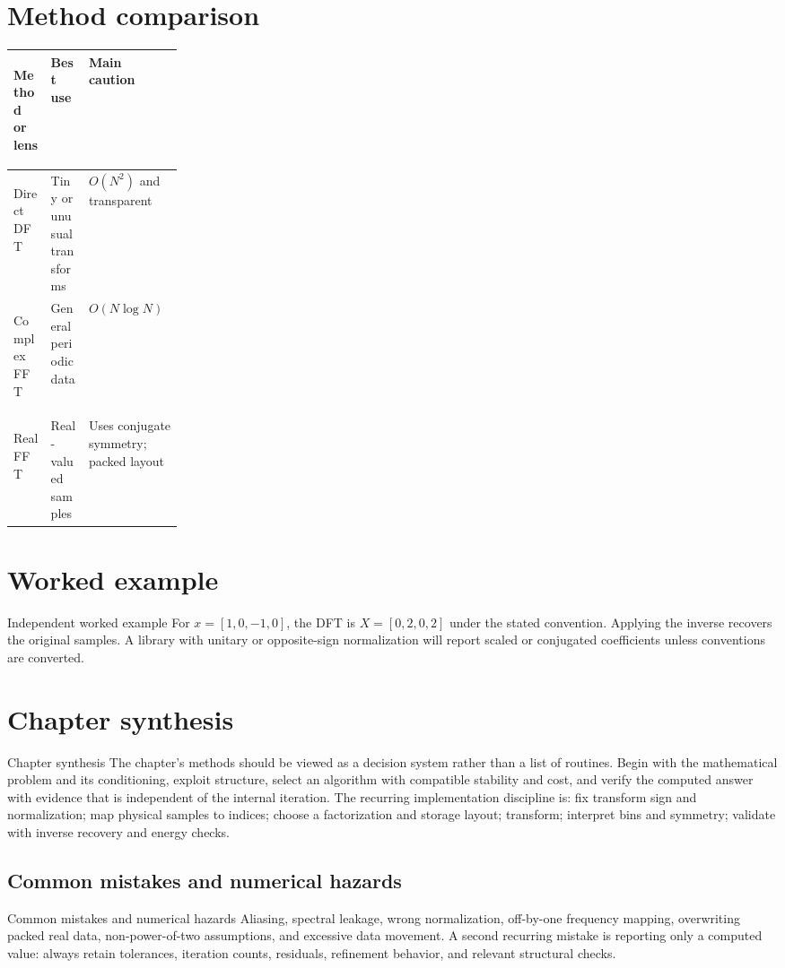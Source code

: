 \documentclass[10pt,letterpaper]{article}
\begin{document}
\section*{Method comparison}
\begin{center}
\small
\begin{tabularx}{\linewidth}{>{\bfseries\raggedright\arraybackslash}p{0.22\linewidth}XX}
\toprule
Method or lens & Best use & Main caution \\
\midrule
Direct DFT & Tiny or unusual transforms & $O(N^2)$ and transparent \\
Complex FFT & General periodic data & $O(N\log N)$ \\
Real FFT & Real-valued samples & Uses conjugate symmetry; packed layout \\
\bottomrule
\end{tabularx}
\end{center}

\section*{Worked example}
\begin{exambox}{Independent worked example}
For $x=[1,0,-1,0]$, the DFT is $X=[0,2,0,2]$ under the stated convention.  Applying the inverse recovers the original samples.  A library with unitary or opposite-sign normalization will report scaled or conjugated coefficients unless conventions are converted.
\end{exambox}

\section*{Chapter synthesis}
\begin{summarybox}{Chapter synthesis}
The chapter's methods should be viewed as a decision system rather than a list of routines.  Begin with the mathematical problem and its conditioning, exploit structure, select an algorithm with compatible stability and cost, and verify the computed answer with evidence that is independent of the internal iteration.  The recurring implementation discipline is: fix transform sign and normalization; map physical samples to indices; choose a factorization and storage layout; transform; interpret bins and symmetry; validate with inverse recovery and energy checks.
\end{summarybox}

\subsection*{Common mistakes and numerical hazards}
\begin{warnbox}{Common mistakes and numerical hazards}
Aliasing, spectral leakage, wrong normalization, off-by-one frequency mapping, overwriting packed real data, non-power-of-two assumptions, and excessive data movement.  A second recurring mistake is reporting only a computed value: always retain tolerances, iteration counts, residuals, refinement behavior, and relevant structural checks.
\end{warnbox}
\end{document}
